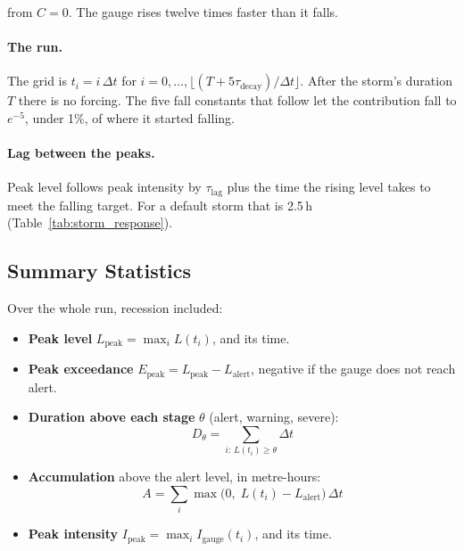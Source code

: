 \documentclass[11pt,a4paper]{article}
\newcommand{\sgLag}{2.5}
\begin{document}
\noindent from $C=0$. The gauge rises twelve times faster than it falls.

\paragraph{The run.} The grid is $t_i = i\,\Delta t$ for
$i = 0, \ldots, \lfloor (T + 5\tau_{\text{decay}})/\Delta t \rfloor$. After the storm's
duration $T$ there is no forcing. The five fall constants that follow let the
contribution fall to $e^{-5}$, under 1\%, of where it started falling.

\paragraph{Lag between the peaks.} Peak level follows peak intensity by
$\tau_{\text{lag}}$ plus the time the rising level takes to meet the falling target.
For a default storm that is \sgLag\,h (Table~\ref{tab:storm_response}).

\subsection{Summary Statistics}
\label{sec:summary_stats}

Over the whole run, recession included:

\begin{itemize}[nosep]
    \item \textbf{Peak level} $L_{\text{peak}} = \max_i L(t_i)$, and its time.
    \item \textbf{Peak exceedance} $E_{\text{peak}} = L_{\text{peak}} - L_{\text{alert}}$,
          negative if the gauge does not reach alert.
    \item \textbf{Duration above each stage} $\theta$ (alert, warning, severe):
          \begin{equation}
              D_{\theta} = \sum_{i:\, L(t_i) \geq \theta} \Delta t
              \label{eq:duration}
          \end{equation}
    \item \textbf{Accumulation} above the alert level, in metre-hours:
          \begin{equation}
              A = \sum_{i} \max\!\bigl(0,\; L(t_i) - L_{\text{alert}}\bigr)\,\Delta t
              \label{eq:accumulation}
          \end{equation}
    \item \textbf{Peak intensity} $I_{\text{peak}} = \max_i I_{\text{gauge}}(t_i)$,
          and its time.
\end{itemize}
\end{document}
